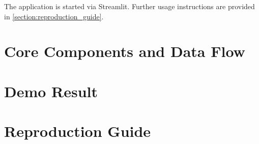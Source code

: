     The application is started via Streamlit. Further usage instructions are provided in \autoref{section:reproduction_guide}.

\section{Core Components and Data Flow}

\section{Demo Result}

\section{Reproduction Guide} \label{section:reproduction_guide}
